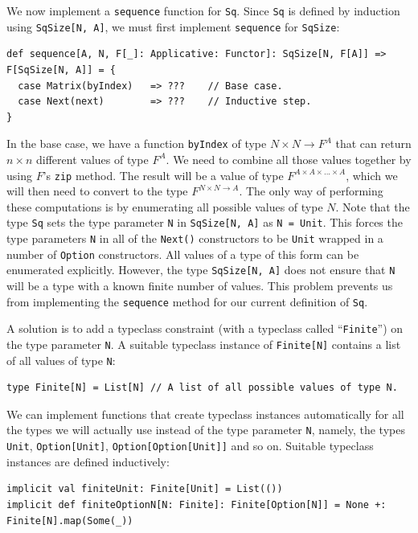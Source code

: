 We now implement a \lstinline!sequence! function for \lstinline!Sq!.
Since \lstinline!Sq! is defined by induction using \lstinline!SqSize[N, A]!,
we must first implement \lstinline!sequence! for \lstinline!SqSize!:
\begin{lstlisting}
def sequence[A, N, F[_]: Applicative: Functor]: SqSize[N, F[A]] => F[SqSize[N, A]] = {
  case Matrix(byIndex)   => ???    // Base case.
  case Next(next)        => ???    // Inductive step.
}
\end{lstlisting}
In the base case, we have a function \lstinline!byIndex! of type
$N\times N\rightarrow F^{A}$ that can return $n\times n$ different
values of type $F^{A}$. We need to combine all those values together
by using $F$\textsf{'}s \lstinline!zip! method. The result will be a value
of type $F^{A\times A\times...\times A}$, which we will then need
to convert to the type $F^{N\times N\rightarrow A}$. The only way
of performing these computations is by enumerating all possible values
of type $N$. Note that the type \lstinline!Sq! sets the type parameter
\lstinline!N! in \lstinline!SqSize[N, A]! as \lstinline!N = Unit!.
This forces the type parameters \lstinline!N! in all of the \lstinline!Next()!
constructors to be \lstinline!Unit! wrapped in a number of \lstinline!Option!
constructors. All values of a type of this form can be enumerated
explicitly. However, the type \lstinline!SqSize[N, A]! does not ensure
that \lstinline!N! will be a type with a known finite number of values.
This problem prevents us from implementing the \lstinline!sequence!
method for our current definition of \lstinline!Sq!.

A solution is to add a typeclass constraint (with a typeclass called
\textsf{``}\lstinline!Finite!\textsf{''}) on the type parameter \lstinline!N!. A
suitable typeclass instance of \lstinline!Finite[N]! contains a list
of all values of type \lstinline!N!:
\begin{lstlisting}
type Finite[N] = List[N] // A list of all possible values of type N.
\end{lstlisting}
We can implement functions that create typeclass instances automatically
for all the types we will actually use instead of the type parameter
\lstinline!N!, namely, the types \lstinline!Unit!, \lstinline!Option[Unit]!,
\lstinline!Option[Option[Unit]]! and so on. Suitable typeclass instances
are defined inductively:
\begin{lstlisting}
implicit val finiteUnit: Finite[Unit] = List(())
implicit def finiteOptionN[N: Finite]: Finite[Option[N]] = None +: Finite[N].map(Some(_))
\end{lstlisting}

